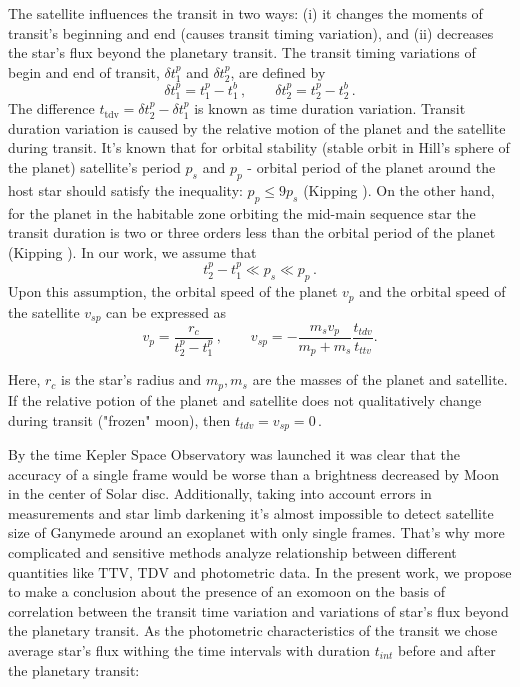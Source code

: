 \documentclass[12pt]{article}
\begin{document}
The satellite influences the transit in two ways: (i) it changes the moments of transit's beginning and end (causes transit timing variation), and (ii) decreases the star's flux beyond the planetary transit. The transit timing variations of begin and end of transit, $\delta t^p_1$ and $\delta t^p_2$, are defined by
\begin{equation}\label{ttvs}
\delta t^p_1=t^p_1-t^b_1\,,\qquad \delta t^p_2=t^p_2-t^b_2\,.
\end{equation}
The difference $ t_{\mathrm{tdv}}=\delta t^p_2-\delta t^p_1$ is known as time duration variation. Transit duration variation is caused by the relative motion of the planet and the satellite during transit. 
It's known that for orbital stability (stable orbit in Hill's sphere of the planet) satellite's period $p_s$ and $p_p$ - orbital period of the planet around the host star should satisfy the inequality: $p_p\leq9p_s$ (Kipping \cite{kipp1}). On the other hand, for the planet in the habitable zone orbiting the mid-main sequence star the transit duration is two or three orders less than the orbital period of the planet (Kipping \cite{kipp1}). In our work, we assume that
\begin{equation}\label{smm}
t^p_2-t^p_1\ll p_s \ll p_p\,.
\end{equation}
Upon this assumption, the orbital speed of the planet $v_p$ and the orbital speed of the satellite $v_{sp}$ can be expressed as
\begin{equation}\label{smm}
v_p=\frac{r_c}{t^p_2-t^p_1}\,,\qquad v_{sp}=-\frac{m_sv_p}{m_p+m_s}\frac{t_{tdv}}{t_{ttv}}.
\end{equation}

Here, $r_c$ is the star's radius and $m_p,m_s$ are the masses of the planet and satellite. If the relative potion of the planet and satellite does not qualitatively change during transit ("frozen" moon), then $t_{tdv}=v_{sp}=0\,.$ 


By the time Kepler Space Observatory was launched it was clear that the accuracy of a single frame would be worse than a brightness decreased by Moon in the center of Solar disc. Additionally, taking into account errors in measurements and star limb darkening it's almost impossible to detect satellite size of Ganymede around an exoplanet with only single frames.  That's why more complicated and sensitive methods analyze relationship between different quantities like $\mathrm{TTV}$, $\mathrm{TDV}$ and photometric data.
In the present work, we propose to make a conclusion about the presence of an exomoon on the basis of correlation between the transit time variation and variations of star's flux beyond the planetary transit. As the photometric characteristics of the transit we chose average star's flux withing the time intervals with duration $t_{int}$ before and after the planetary transit:
\end{document}
